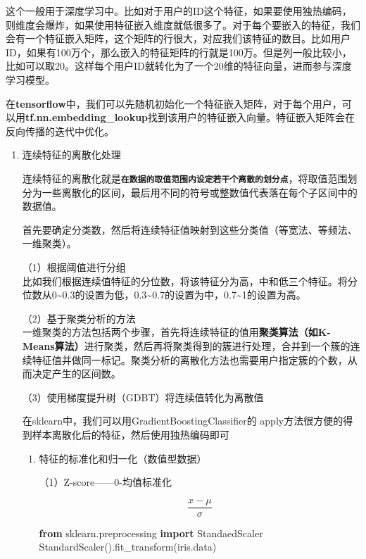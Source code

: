 \documentclass[
]{article}
\newenvironment{Shaded}{}{}
\newcommand{\ImportTok}[1]{\textcolor[rgb]{0.00,0.50,0.00}{\textbf{#1}}}
\newcommand{\NormalTok}[1]{#1}
\begin{document}
这个一般用于深度学习中。比如对于用户的ID这个特征，如果要使用独热编码，则维度会爆炸，如果使用特征嵌入维度就低很多了。对于每个要嵌入的特征，我们会有一个特征嵌入矩阵，这个矩阵的行很大，对应我们该特征的数目。比如用户ID，如果有100万个，那么嵌入的特征矩阵的行就是100万。但是列一般比较小，比如可以取20。这样每个用户ID就转化为了一个20维的特征向量，进而参与深度学习模型。

在\textbf{tensorflow}中，我们可以先随机初始化一个特征嵌入矩阵，对于每个用户，可以用\textbf{tf.nn.embedding\_lookup}找到该用户的特征嵌入向量。特征嵌入矩阵会在反向传播的迭代中优化。

\begin{enumerate}
\def\labelenumi{\arabic{enumi}.}
\item
  连续特征的离散化处理

  连续特征的离散化就是\textbf{\texttt{在数据的取值范围内设定若干个离散的划分点}}，将取值范围划分为一些离散化的区间，最后用不同的符号或整数值代表落在每个子区间中的数据值。

  首先要确定分类数，然后将连续特征值映射到这些分类值（等宽法、等频法、一维聚类）。

  （1）根据阈值进行分组\\
  比如我们根据连续值特征的分位数，将该特征分为高，中和低三个特征。将分位数从0\textasciitilde0.3的设置为低，0.3\textasciitilde0.7的设置为中，0.7\textasciitilde1的设置为高。

  （2）基于聚类分析的方法\\
  一维聚类的方法包括两个步骤，首先将连续特征的值用\textbf{聚类算法（如K-Means算法）}进行聚类，然后再将聚类得到的簇进行处理，合并到一个簇的连续特征值并做同一标记。聚类分析的离散化方法也需要用户指定簇的个数，从而决定产生的区间数。

  （3）使用梯度提升树（GDBT）将连续值转化为离散值

  在sklearn中，我们可以用GradientBoostingClassifier的
  apply方法很方便的得到样本离散化后的特征，然后使用独热编码即可

  \begin{enumerate}
  \def\labelenumii{\arabic{enumii}.}
  \item
    特征的标准化和归一化（数值型数据）

    （1）Z-score------0-均值标准化

    \[\frac{x-\mu}{\sigma}\]

\begin{Shaded}
\begin{Highlighting}[]
\ImportTok{from}\NormalTok{ sklearn.preprocessing }\ImportTok{import}\NormalTok{ StandaedScaler}
\NormalTok{StandardScaler().fit\_transform(iris.data)}
\end{Highlighting}
\end{Shaded}


\end{enumerate}
\end{enumerate}
\end{document}
